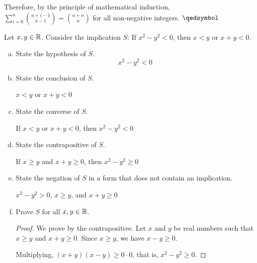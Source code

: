 \documentclass{agony}
\begin{document}
Therefore, by the principle of mathematical induction,
$\sum_{i=0}^n\binom{a+i-1}{a-1} = \binom{a+n}{a}$
for all non-negative integers. $\qedsymbol$


\question Let $x,y\in\mathbb{R}$. Consider the implication $S$:
If $x^2-y^2 < 0$, then $x<y$ or $x+y < 0$.
\begin{enumerate}[(a)]
  \item State the hypothesis of $S$.
        \[ x^2-y^2 < 0 \]
  \item State the conclusion of $S$.
        \begin{center}
          $x<y$ or $x+y<0$
        \end{center}
  \item State the converse of $S$.
        \begin{center}
          If $x<y$ or $x+y<0$, then $x^2-y^2<0$
        \end{center}
  \item State the contrapositive of $S$.
        \begin{center}
          If $x\geq y$ and $x+y \geq 0$, then $x^2-y^2 \geq 0$
        \end{center}
  \item State the negation of $S$ in a form that does not contain an implication.
        \begin{center}
          $x^2-y^2 > 0$, $x \geq y$, and $x+y \geq 0$
        \end{center}
  \item Prove $S$ for all $x,y\in\mathbb{R}$.
        \begin{proof}
          We prove by the contrapositive.
          Let $x$ and $y$ be real numbers such that $x \geq y$ and $x+y \geq 0$.
          Since $x \geq y$, we have $x-y \geq 0$.

          Multiplying, $(x+y)(x-y) \geq 0\cdot 0$, that is, $x^2-y^2 \geq 0$.
        \end{proof}
\end{enumerate}
\end{document}
